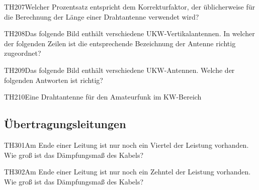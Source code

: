 \begin{question}{TH207}{Welcher Prozentsatz entspricht dem Korrekturfaktor, der üblicherweise für die Berechnung der Länge einer Drahtantenne verwendet wird?}
\end{question}

\begin{question}{TH208}{Das folgende Bild enthält verschiedene UKW-Vertikalantennen. In welcher der folgenden Zeilen ist die entsprechende Bezeichnung der Antenne richtig zugeordnet?}
\end{question}

\begin{question}{TH209}{Das folgende Bild enthält verschiedene UKW-Antennen. Welche der folgenden Antworten ist richtig?}
\end{question}

\begin{question}{TH210}{Eine Drahtantenne für den Amateurfunk im KW-Bereich}
\end{question}

\subsection{Übertragungsleitungen}

\begin{question}{TH301}{Am Ende einer Leitung ist nur noch ein Viertel der Leistung vorhanden. Wie groß ist das Dämpfungsmaß des Kabels?}
\end{question}

\begin{question}{TH302}{Am Ende einer Leitung ist nur noch ein Zehntel der Leistung vorhanden. Wie groß ist das Dämpfungsmaß des Kabels?}
\end{question}

